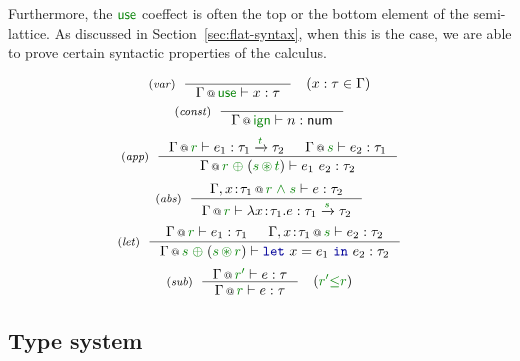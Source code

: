 Furthermore, the $\cunit$ coeffect is often the top or the bottom element of the semi-lattice.
As discussed in Section~\ref{sec:flat-syntax}, when this is the case, we are able to prove certain
syntactic properties of the calculus.


\begin{figure}[t]
\begin{equation*}
\tyrule{var}
  {~}
  {\coctx{\Gamma}{\cunit} \vdash x : \tau }\quad(x : \tau \in \Gamma)
\end{equation*}
\begin{equation*}
\tyrule{const}
  {~}
  {\coctx{\Gamma}{\czero} \vdash n : \ident{num} }
\end{equation*}
\begin{equation*}
\tyrule{app}
  {\coctx{\Gamma}{\cclrd{r}} \vdash e_1 : \tau_1 \xrightarrow{\cclrd{t}} \tau_2 &
   \coctx{\Gamma}{\cclrd{s}} \vdash e_2 : \tau_1 }
  {\coctx{\Gamma}{\cclrd{r} \;\cpar\; (\cclrd{s} \,\cseq\, \cclrd{t})} \vdash e_1~e_2 : \tau_2}
\end{equation*}
\begin{equation*}
\tyrule{abs}
  {\coctx{\Gamma, x\!:\!\tau_1}{\cclrd{r}\;\czip\;\cclrd{s}} \vdash e : \tau_2}
  {\coctx{\Gamma}{\cclrd{r}} \vdash \lambda x\!:\!\tau_1.e : \tau_1 \xrightarrow{\cclrd{s}} \tau_2 }
\end{equation*}
\begin{equation*}
\tyrule{let}
  { \coctx{\Gamma}{\cclrd{r}} \vdash e_1 : \tau_1 &
    \coctx{\Gamma, x\!:\!\tau_1}{\cclrd{s}} \vdash e_2 : \tau_2}
  {\coctx{\Gamma}{\cclrd{s} \;\cpar\; (\cclrd{s} \,\cseq\, \cclrd{r})} \vdash \kvd{let}~x=e_1~\kvd{in}~e_2 : \tau_2 }
\end{equation*}
%
\begin{equation*}
\tyrule{sub}
  {\coctx{\Gamma}{\cclrd{r'}} \vdash e : \tau }
  {\coctx{\Gamma}{\cclrd{r}} \vdash e : \tau }\quad(\cclrd{r'} \cleq \cclrd{r})
\end{equation*}
%

\label{fig:flat-types}
\end{figure}


\subsection{Type system}
\label{sec:flat-calculus-types}

